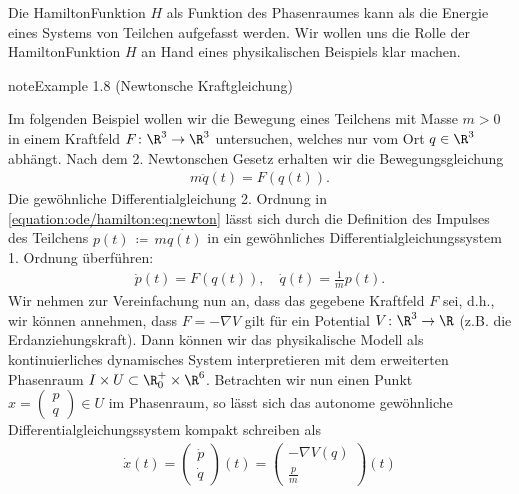 \documentclass[letterpaper,10pt,english]{jupyterBook}
\begin{document}
\sphinxAtStartPar
Die Hamilton\sphinxhyphen{}Funktion \(H\) als Funktion des Phasenraumes kann als die Energie eines Systems von Teilchen aufgefasst werden.
Wir wollen uns die Rolle der Hamilton\sphinxhyphen{}Funktion \(H\) an Hand eines physikalischen Beispiels klar machen.
\label{ode/hamilton:example-3}
\begin{sphinxadmonition}{note}{Example 1.8 (Newtonsche Kraftgleichung)}



\sphinxAtStartPar
Im folgenden Beispiel wollen wir die Bewegung eines Teilchens mit Masse \(m>0\) in einem Kraftfeld \(F \colon \R^3 \rightarrow \R^3\)  untersuchen, welches nur vom Ort \(q \in \R^3\) abhängt.
Nach dem 2. Newtonschen Gesetz erhalten wir die Bewegungsgleichung
\begin{equation}\label{equation:ode/hamilton:eq:newton}
\begin{split}m\ddot{q}(t) = F(q(t)).\end{split}
\end{equation}
\sphinxAtStartPar
Die gewöhnliche Differentialgleichung 2. Ordnung in \eqref{equation:ode/hamilton:eq:newton} lässt sich durch die Definition des Impulses des Teilchens \(p(t) \, \coloneqq \, m \dot{q(t)}\) in ein gewöhnliches Differentialgleichungssystem 1. Ordnung überführen:
\begin{equation*}
\begin{split}\dot{p}(t) = F(q(t)), \quad \dot{q}(t) = \frac{1}{m}p(t).\end{split}
\end{equation*}
\sphinxAtStartPar
Wir nehmen zur Vereinfachung nun an, dass das gegebene Kraftfeld \(F\)  sei, d.h., wir können annehmen, dass \(F = - \nabla V\) gilt für ein Potential \(V \colon \R^3 \rightarrow \R\) (z.B. die Erdanziehungskraft).
Dann können wir das physikalische Modell als kontinuierliches dynamisches System interpretieren mit dem erweiterten Phasenraum \(I \times U \subset \R^+_0 \times \R^6\).
Betrachten wir nun einen Punkt \(x = \begin{pmatrix} p \\ q\end{pmatrix} \in U\) im Phasenraum, so lässt sich das autonome gewöhnliche Differentialgleichungssystem kompakt schreiben als
\begin{equation}\label{equation:ode/hamilton:eq:newton_DGL}
\begin{split}\dot{x}(t) = \begin{pmatrix} \dot{p} \\ \dot{q} \end{pmatrix}(t) = \begin{pmatrix} -\nabla V(q) \\ \frac{p}{m} \end{pmatrix}(t)\end{split}

\end{equation}
\end{sphinxadmonition}
\end{document}
